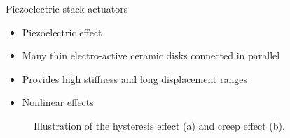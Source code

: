 \documentclass[10pt]{beamer}
\begin{document}
\begin{frame}{Piezoelectric stack actuators}
  \begin{itemize}
    \item Piezoelectric effect
    \item Many thin electro-active ceramic disks connected in parallel
    \item Provides high stiffness and long displacement ranges
    \item Nonlinear effects
  \end{itemize}

  \begin{figure}[h!]
    \centering %
    \qquad
    \caption{\label{fig:effects} Illustration of the hysteresis effect (a) and creep effect (b).}
  \end{figure}
\end{frame}
\end{document}
